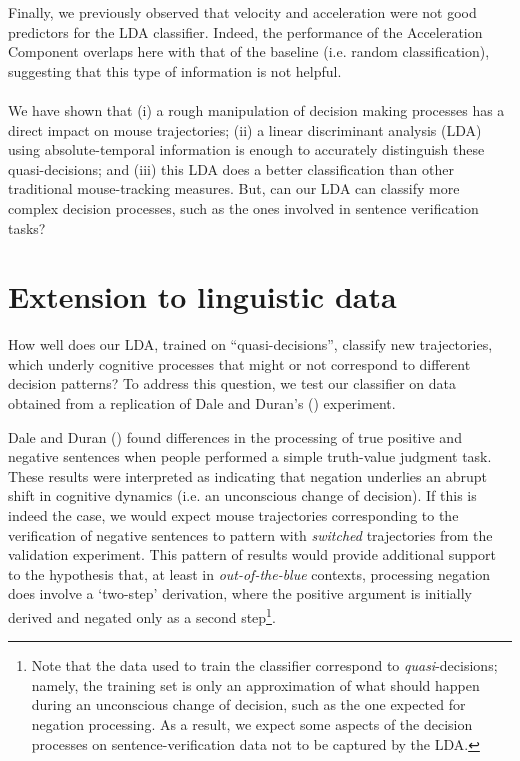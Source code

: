 \documentclass{article}
\begin{document}
Finally, we previously observed that velocity and acceleration were not good predictors for the LDA classifier. Indeed, the performance of the Acceleration Component overlaps here with that of the baseline (i.e. random classification), suggesting that this type of information is not helpful.

\paragraph{}
We have shown that (i) a rough manipulation of decision making processes has a direct impact on mouse trajectories; (ii) a linear discriminant analysis (LDA) using absolute-temporal information is enough to accurately distinguish these quasi-decisions; and (iii) this LDA does a better classification than other traditional mouse-tracking measures. But, can our LDA can classify more complex decision processes, such as the ones involved in sentence verification tasks? 


\section{Extension to linguistic data}
\label{section:replication}
How well does our LDA, trained on “quasi-decisions”, classify new trajectories, which underly cognitive processes that might or not correspond to different decision patterns? To address this question, we test our classifier on data obtained from a replication of Dale and Duran's (\citeyear{Dale2011})  experiment.   
 
Dale and Duran (\citeyear{Dale2011}) found differences in the processing of true positive and negative sentences when people performed a simple truth-value judgment task. These results were interpreted as indicating that negation underlies an abrupt shift in cognitive dynamics (i.e. an unconscious change of decision). If this is indeed the case, we would expect mouse trajectories corresponding to the verification of negative sentences to pattern with \emph{switched} trajectories from the validation experiment. This pattern of results would provide additional support to the hypothesis that, at least in \emph{out-of-the-blue} contexts, processing negation does involve a `two-step' derivation, where the positive argument is initially derived and negated only as a second step\footnote{Note that the data used to train the classifier correspond to \emph{quasi}-decisions; namely, the training set is only an approximation of what should happen during an unconscious change of decision, such as the one expected for negation processing. As a result, we expect some aspects of the decision processes on sentence-verification data not to be captured by the LDA.}. 
\end{document}
